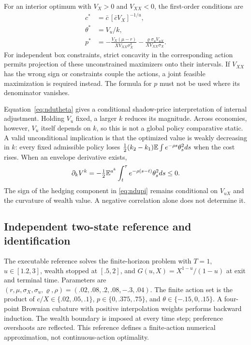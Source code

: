 For an interior optimum with $V_X>0$ and $V_{XX}<0$, the first-order conditions are
\begin{align}
 c^*&=\bar c\,[\bar c V_X]^{-1/u},\label{eq:nduc}\\
 \theta^*&=V_u/k,\label{eq:ndutheta}\\
 p^*&=-\frac{V_X(\mu-r)}{XV_{XX}\sigma_X^2}
       -\frac{\varrho\sigma_u V_{uX}}{XV_{XX}\sigma_X}.\label{eq:ndupi}
\end{align}
For independent box constraints, strict concavity in the corresponding action permits projection of these unconstrained maximizers onto their intervals. If $V_{XX}$ has the wrong sign or constraints couple the actions, a joint feasible maximization is required instead. The formula for $p$ must not be used where its denominator vanishes.

Equation~\eqref{eq:ndutheta} gives a conditional shadow-price interpretation of internal adjustment. Holding $V_u$ fixed, a larger $k$ reduces its magnitude. Across economies, however, $V_u$ itself depends on $k$, so this is not a global policy comparative static. A valid unconditional implication is that the optimized value is weakly decreasing in $k$: every fixed admissible policy loses $\tfrac12(k_2-k_1)\mathbb E\int e^{-\rho s}\theta_s^2ds$ when the cost rises. When an envelope derivative exists,
\begin{equation}\label{eq:envelope}
 \partial_k V^k=-\tfrac12\mathbb E^{a^k}\int_t^\tau e^{-\rho(s-t)}\theta_s^2ds\leq0.
\end{equation}
The sign of the hedging component in \eqref{eq:ndupi} remains conditional on $V_{uX}$ and the curvature of wealth value. A negative correlation alone does not determine it.

\subsection{Independent two-state reference and identification}
The executable reference solves the finite-horizon problem with $T=1$, $u\in[1.2,3]$, wealth stopped at $[.5,2]$, and $G(u,X)=X^{1-u}/(1-u)$ at exit and terminal time. Parameters are $(r,\mu,\sigma_X,\sigma_u,\varrho,\rho)=(.02,.08,.2,.08,-.3,.04)$. The finite action set is the product of $c/X\in\{.02,.05,.1\}$, $p\in\{0,.375,.75\}$, and $\theta\in\{-.15,0,.15\}$. A four-point Brownian cubature with positive interpolation weights performs backward induction. The wealth boundary is imposed at every time step; preference overshoots are reflected. This reference defines a finite-action numerical approximation, not continuous-action optimality.

